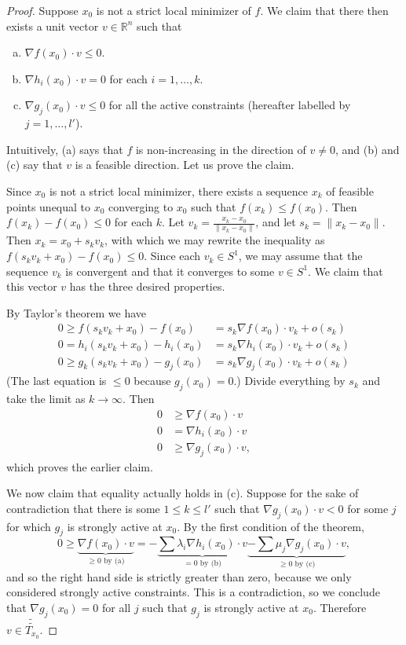 \documentclass[11pt]{book}
\newcommand{\R}{\mathbb{R}}
\begin{document}
\begin{proof}
Suppose $x_0$ is not a strict local minimizer of $f$. We claim that there then exists a unit vector $v \in \R^n$ such that
\begin{enumerate}[(a)]
\item $\nabla f(x_0) \cdot v \leq 0$.
\item $\nabla h_i(x_0) \cdot v = 0$ for each $i = 1, \dots, k$.
\item $\nabla g_j(x_0) \cdot v \leq 0$ for all the active constraints (hereafter labelled by $j = 1,\dots, l'$).
\end{enumerate}
Intuitively, (a) says that $f$ is non-increasing in the direction of $v \neq 0$, and (b) and (c) say that $v$ is a feasible direction. Let us prove the claim.

Since $x_0$ is not a strict local minimizer, there exists a sequence $x_k$ of feasible points unequal to $x_0$ converging to $x_0$ such that $f(x_k) \leq f(x_0)$. Then $f(x_k) - f(x_0) \leq 0$ for each $k$. Let $v_k = \frac{x_k-x_0}{\|x_k-x_0\|}$, and let $s_k = \|x_k - x_0\|$. Then $x_k = x_0 + s_kv_k$, with which we may rewrite the inequality as $f(s_kv_k + x_0) - f(x_0) \leq 0$. Since each $v_k \in S^1$, we may assume that the sequence $v_k$ is convergent and that it converges to some $v \in S^1$. We claim that this vector $v$ has the three desired properties.

By Taylor's theorem we have
\begin{align*}
0 \geq f(s_kv_k + x_0) - f(x_0) &= s_k \nabla f(x_0) \cdot v_k + o(s_k) \tag{A}\\
0 = h_i(s_kv_k + x_0) - h_i(x_0) &= s_k \nabla h_i(x_0) \cdot v_k + o(s_k) \tag{B} \\
0 \geq g_k(s_kv_k+x_0) - g_j(x_0) &= s_k \nabla g_j(x_0) \cdot v_k + o(s_k) \tag{C}
\end{align*}
(The last equation is $\leq 0$ because $g_j(x_0) = 0$.) Divide everything by $s_k$ and take the limit as $k \to \infty$. Then
\begin{align*}
0 &\geq \nabla f(x_0) \cdot v \tag{a}\\
0 &= \nabla h_i(x_0) \cdot v \tag{b}\\
0 &\geq \nabla g_j(x_0) \cdot v \tag{c},
\end{align*}
which proves the earlier claim.

We now claim that equality actually holds in (c). Suppose for the sake of contradiction that there is some $1 \leq k \leq l'$ such that $\nabla g_j(x_0) \cdot v < 0$ for some $j$ for which $g_j$ is strongly active at $x_0$. By the first condition of the theorem,
\[
0 \geq \underbrace{\nabla f(x_0) \cdot v}_{\text{$\geq 0$ by (a)}} = -\underbrace{\sum \lambda_i \nabla h_i(x_0)\cdot v}_{\text{$=0$ by (b)}} \underbrace{- \sum \mu_j \nabla g_j(x_0)\cdot v}_{\text{$\geq 0$ by (c)}},
\]
and so the right hand side is strictly greater than zero, because we only considered strongly active constraints. This is a contradiction, so we conclude that $\nabla g_j(x_0) = 0$ for all $j$ such that $g_j$ is strongly active at $x_0$. Therefore $v \in \tilde{\tilde{T_{x_0}}}$.


\end{proof}
\end{document}
